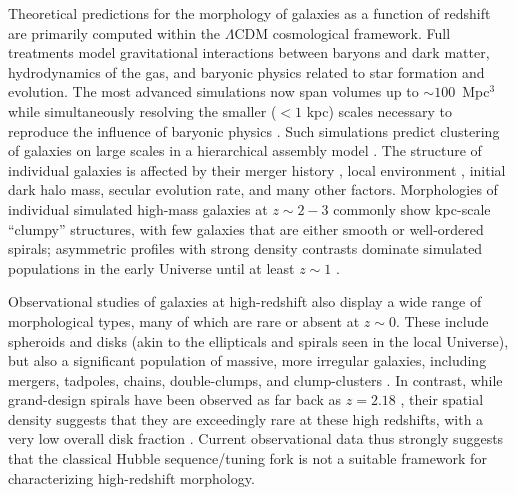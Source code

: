 \documentclass[twocolumn]{aastex6}
\begin{document}
Theoretical predictions for the morphology of galaxies as a function of
redshift are primarily computed within the $\Lambda$CDM cosmological framework.
Full treatments model gravitational interactions between baryons and dark
matter, hydrodynamics of the gas, and baryonic physics related to star
formation and evolution. The most advanced simulations now span volumes up to
$\sim100$~Mpc$^3$ while simultaneously resolving the smaller ($<1$ kpc) scales
necessary to reproduce the influence of baryonic physics \citep{vog14a,sch15}.
Such simulations predict clustering of galaxies on large scales in a
hierarchical assembly model \citep{sil12}. The structure of individual galaxies
is affected by their merger history \citep{too72,ste02,hop10}, local
environment \citep[such as the morphology-density relation;][]{dre80}, initial
dark halo mass, secular evolution rate, and many other factors. Morphologies of
individual simulated high-mass galaxies at $z\sim2-3$ commonly show kpc-scale
``clumpy'' structures, with few galaxies that are either smooth or well-ordered
spirals; asymmetric profiles with strong density contrasts dominate simulated
populations in the early Universe until at least $z\sim1$ \citep{bel12,gen14}. 

Observational studies of galaxies at high-redshift also display a wide range of
morphological types, many of which are rare or absent at $z\sim0$.  These
include spheroids and disks (akin to the ellipticals and spirals seen in the
local Universe), but also a significant population of massive, more irregular
galaxies, including mergers, tadpoles, chains, double-clumps, and
clump-clusters \citep{elm05,elm07,cam11a,for11a,kar15}.  In contrast, while
grand-design spirals have been observed as far back as $z=2.18$ \citep{law12},
their spatial density suggests that they are exceedingly rare at these high
redshifts, with a very low overall disk fraction \citep{mor13}. Current
observational data thus strongly suggests that the classical Hubble
sequence/tuning fork \citep{hub36} is not a suitable framework for
characterizing high-redshift morphology. 
\end{document}
